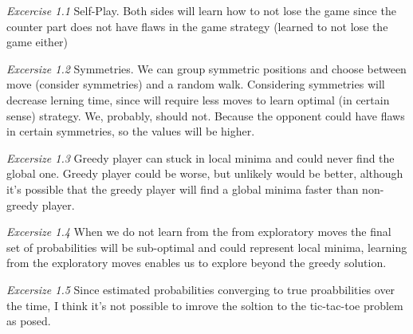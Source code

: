 \documentclass{article}
\begin{document}
\textit{Excercise 1.1} Self-Play. Both sides will learn how to not lose the game since the counter part does not have flaws in the game strategy (learned to not lose the game either)

\textit{Excersize 1.2} Symmetries. We can group symmetric positions and choose between move (consider symmetries) and a random walk. Considering symmetries will decrease lerning time, since
will require less moves to learn optimal (in certain sense) strategy. We, probably, should not. Because the opponent could have flaws in certain symmetries, so the values will be higher.

\textit{Excersize 1.3} Greedy player can stuck in local minima and could never find the global one. Greedy player could be worse, but unlikely would be better, although it's possible that the greedy player
will find a global minima faster than non-greedy player.

\textit{Excersize 1.4} When we do not learn from the from exploratory moves the final set of probabilities will be sub-optimal and could represent local minima, learning from the exploratory moves
enables us to explore beyond the greedy solution.

\textit{Excersize 1.5} Since estimated probabilities converging to true proabbilities over the time, I think it's not possible to imrove the soltion to the tic-tac-toe problem as posed.
\end{document}
